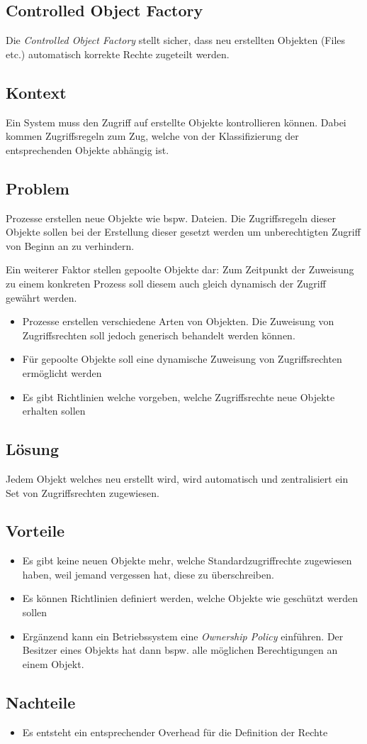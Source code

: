 \subsection{Controlled Object Factory}
\label{sec:controlled-object-factory}

Die \emph{Controlled Object Factory} stellt sicher, dass neu erstellten Objekten (Files etc.) automatisch korrekte Rechte zugeteilt werden.

\subsection*{Kontext}
Ein System muss den Zugriff auf erstellte Objekte kontrollieren können. Dabei kommen Zugriffsregeln zum Zug, welche von der Klassifizierung der entsprechenden Objekte abhängig ist.

\subsection*{Problem}
Prozesse erstellen neue Objekte wie bspw. Dateien. Die Zugriffsregeln dieser Objekte sollen bei der Erstellung dieser gesetzt werden um unberechtigten Zugriff von Beginn an zu verhindern.

Ein weiterer Faktor stellen gepoolte Objekte dar: Zum Zeitpunkt der Zuweisung zu einem konkreten Prozess soll diesem auch gleich dynamisch der Zugriff gewährt werden.

\begin{itemize}
	\item Prozesse erstellen verschiedene Arten von Objekten. Die Zuweisung von Zugriffsrechten soll jedoch generisch behandelt werden können.
	\item Für gepoolte Objekte soll eine dynamische Zuweisung von Zugriffsrechten ermöglicht werden
	\item Es gibt Richtlinien welche vorgeben, welche Zugriffsrechte neue Objekte erhalten sollen
\end{itemize}


\subsection*{Lösung}
Jedem Objekt welches neu erstellt wird, wird automatisch und zentralisiert ein Set von Zugriffsrechten zugewiesen.


\subsection*{Vorteile}
\begin{itemize}
	\item Es gibt keine neuen Objekte mehr, welche Standardzugriffrechte zugewiesen haben, weil jemand vergessen hat, diese zu überschreiben.
	\item Es können Richtlinien definiert werden, welche Objekte wie geschützt werden sollen
	\item Ergänzend kann ein Betriebssystem eine \emph{Ownership Policy} einführen. Der Besitzer eines Objekts hat dann bspw. alle möglichen Berechtigungen an einem Objekt.
\end{itemize}

\subsection*{Nachteile}
\begin{itemize}
	\item Es entsteht ein entsprechender Overhead für die Definition der Rechte
\end{itemize}
